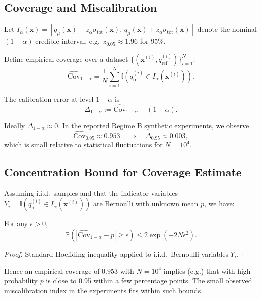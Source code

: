 \documentclass[11pt]{article}
\begin{document}
\subsection{Coverage and Miscalibration}

Let $I_\alpha(\bm{x}) = [q_\mu(\bm{x}) - z_{\alpha} \sigma_{\mathrm{tot}}(\bm{x}),\, q_\mu(\bm{x}) + z_{\alpha} \sigma_{\mathrm{tot}}(\bm{x})]$ denote the nominal $(1-\alpha)$ credible interval, e.g.\ $z_{0.05} \approx 1.96$ for 95\%.

Define empirical coverage over a dataset $\{(\bm{x}^{(i)}, q^{(i)}_\mathrm{ref})\}_{i=1}^N$:
\begin{equation}
  \widehat{\mathrm{Cov}}_{1-\alpha} = \frac{1}{N} \sum_{i=1}^N 
  \mathbb{I}\left( q^{(i)}_\mathrm{ref} \in I_\alpha(\bm{x}^{(i)}) \right).
\end{equation}

\begin{definition}
The calibration error at level $1-\alpha$ is
\[
  \Delta_{1-\alpha} := \widehat{\mathrm{Cov}}_{1-\alpha} - (1-\alpha).
\]
\end{definition}

Ideally $\Delta_{1-\alpha} \approx 0$. In the reported Regime B synthetic experiments, we observe
\[
  \widehat{\mathrm{Cov}}_{0.95} \approx 0.953 \quad \Rightarrow \quad \Delta_{0.95} \approx 0.003,
\]
which is small relative to statistical fluctuations for $N = 10^4$.

\subsection{Concentration Bound for Coverage Estimate}

Assuming i.i.d.\ samples and that the indicator variables $Y_i = \mathbb{I}(q^{(i)}_\mathrm{ref} \in I_\alpha(\bm{x}^{(i)}))$ are Bernoulli with unknown mean $p$, we have:

\begin{theorem}
For any $\epsilon > 0$,
\[
  \mathbb{P}\left(|\widehat{\mathrm{Cov}}_{1-\alpha} - p| \ge \epsilon\right)
  \le 2 \exp\left(-2 N \epsilon^2\right).
\]
\end{theorem}

\begin{proof}
Standard Hoeffding inequality applied to i.i.d.\ Bernoulli variables $Y_i$.
\end{proof}

Hence an empirical coverage of $0.953$ with $N=10^4$ implies (e.g.) that with high probability $p$ is close to 0.95 within a few percentage points. The small observed miscalibration index in the experiments fits within such bounds.
\end{document}
